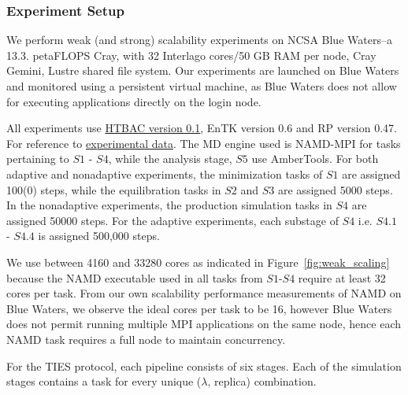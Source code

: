 
\subsubsection{Experiment Setup}\label{ssec:exp_design}

We perform weak (and strong) scalability experiments on NCSA Blue Waters--a
13.3. petaFLOPS Cray, with 32 Interlago cores/50 GB RAM per node, Cray Gemini,
Lustre shared file system. Our experiments are launched on Blue Waters and
monitored using a persistent virtual machine, as Blue Waters does not allow
for executing applications directly on the login node.


All experiments use \href{https://github.com/jdakka/radical.htbac/tree/master}{HTBAC version 0.1},
EnTK version 0.6 and RP version 0.47.
For reference to \href{https://github.com/radical-experiments/isc-htbac-experiments}{experimental data}.
The MD engine used is NAMD-MPI for tasks pertaining to $S1$ - $S4$, while the
analysis stage, $S5$ use AmberTools. For both adaptive and nonadaptive
experiments, the minimization tasks of $S1$ are assigned 100(0) steps, while
the equilibration tasks in $S2$ and $S3$ are assigned 5000 steps. In the
nonadaptive experiments, the production simulation tasks in $S4$ are assigned
50000 steps. For the adaptive experiments, each substage of $S4$ i.e. $S4.1$ -
$S4.4$ is assigned 500,000 steps.


We use between 4160 and 33280 cores as indicated in
Figure~\ref{fig:weak_scaling} because the NAMD executable used in all tasks
from $S1$-$S4$ require at least 32 cores per task. From our own scalability
performance measurements of NAMD on Blue Waters, we observe the ideal cores
per task to be 16, however Blue Waters does not permit running multiple MPI
applications on the same node, hence each NAMD task requires a full node to
maintain concurrency.

For the TIES protocol, each pipeline consists of six stages. Each of the simulation
stages contains a task for every unique ($\lambda$, replica) combination.


